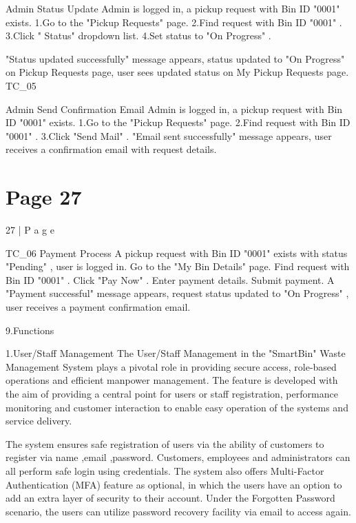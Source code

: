 \documentclass{article}
\begin{document}
Admin Status 
Update 
Admin is logged 
in, a pickup 
request with 
Bin ID "0001" 
exists. 
1.Go to the 
"Pickup 
Requests" 
page. 
2.Find request 
with Bin ID 
"0001" . 
3.Click " Status" 
dropdown list. 
4.Set status to 
"On Progress" . 
 
"Status 
updated 
successfully" 
message 
appears, status 
updated to "On 
Progress" on 
Pickup 
Requests page, 
user sees 
updated status 
on My Pickup 
Requests page. 
TC\_05 
 
Admin Send 
Confirmation 
Email  
Admin is logged 
in, a pickup 
request with 
Bin ID "0001" 
exists. 
1.Go to the 
"Pickup 
Requests" 
page. 
2.Find request 
with Bin ID 
"0001" . 
3.Click "Send 
Mail" . 
"Email sent 
successfully" 
message 
appears, user 
receives a 
confirmation 
email with 
request details. 

\section*{Page 27}
27 | P a g e 
 
TC\_06 Payment 
Process 
A pickup 
request with 
Bin ID "0001" 
exists with 
status 
"Pending" , user 
is logged in. 
Go to the "My 
Bin Details" 
page. 
Find request 
with Bin ID 
"0001" . 
Click "Pay 
Now" . 
Enter payment 
details. 
Submit 
payment. 
A "Payment 
successful" 
message 
appears, 
request status 
updated to "On 
Progress" , user 
receives a 
payment 
confirmation 
email. 
 
9.Functions 
 
1.User/Staff Management 
The User/Staff Management in the "SmartBin" Waste Management System plays a pivotal 
role in providing secure access, role-based operations and efficient manpower 
management. The feature is developed with the aim of providing a central point for users or 
staff registration, performance monitoring and customer interaction to enable easy 
operation of the systems and service delivery. 
 
The system ensures safe registration of users via the ability of customers to register via 
name ,email ,password. Customers, employees and administrators can all perform safe 
login using credentials. The system also offers Multi-Factor Authentication (MFA) feature as 
optional, in which the users have an option to add an extra layer of security to their 
account. Under the Forgotten Password scenario, the users can utilize password recovery 
facility via email to access again. 
 
 
\end{document}
